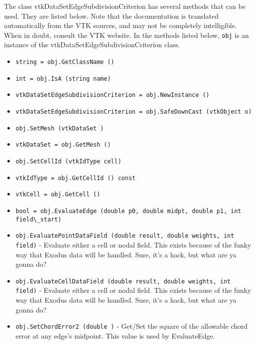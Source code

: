 The class vtkDataSetEdgeSubdivisionCriterion has several methods that can be used.
  They are listed below.
Note that the documentation is translated automatically from the VTK sources,
and may not be completely intelligible.  When in doubt, consult the VTK website.
In the methods listed below, \verb|obj| is an instance of the vtkDataSetEdgeSubdivisionCriterion class.
\begin{itemize}
\item  \verb|string = obj.GetClassName ()|

\item  \verb|int = obj.IsA (string name)|

\item  \verb|vtkDataSetEdgeSubdivisionCriterion = obj.NewInstance ()|

\item  \verb|vtkDataSetEdgeSubdivisionCriterion = obj.SafeDownCast (vtkObject o)|

\item  \verb|obj.SetMesh (vtkDataSet )|

\item  \verb|vtkDataSet = obj.GetMesh ()|

\item  \verb|obj.SetCellId (vtkIdType cell)|

\item  \verb|vtkIdType = obj.GetCellId () const|

\item  \verb|vtkCell = obj.GetCell ()|

\item  \verb|bool = obj.EvaluateEdge (double p0, double midpt, double p1, int field\_start)|

\item  \verb|obj.EvaluatePointDataField (double result, double weights, int field)| -  Evaluate either a cell or nodal field.
 This exists because of the funky way that Exodus data will be handled.
 Sure, it's a hack, but what are ya gonna do?

\item  \verb|obj.EvaluateCellDataField (double result, double weights, int field)| -  Evaluate either a cell or nodal field.
 This exists because of the funky way that Exodus data will be handled.
 Sure, it's a hack, but what are ya gonna do?

\item  \verb|obj.SetChordError2 (double )| -  Get/Set the square of the allowable chord error at any edge's midpoint.
 This value is used by EvaluateEdge.


\end{itemize}
